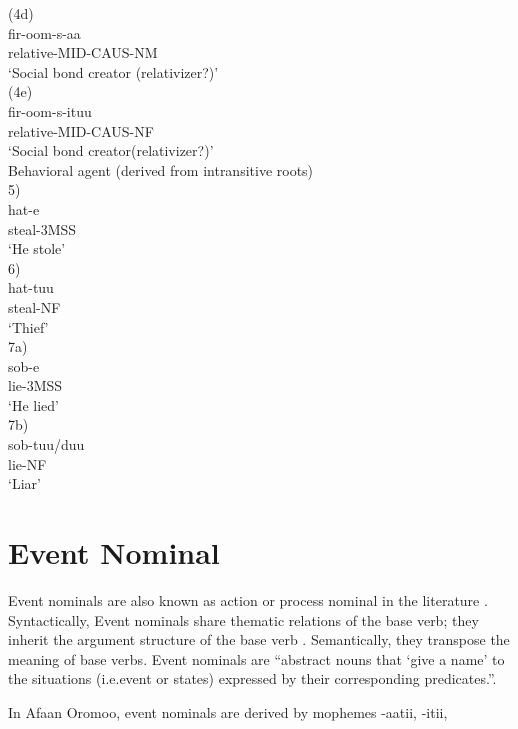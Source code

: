 \documentclass[11pt,a4paper]{article}
\begin{document}
(4d)	\\
\indent fir-oom-s-aa\\
\indent relative-MID-CAUS-NM\\
\indent ‘Social bond creator (relativizer?)’\\

(4e)\\
\indent	fir-oom-s-ituu\\
\indent relative-MID-CAUS-NF\\
\indent ‘Social bond creator(relativizer?)’\\

Behavioral agent (derived from intransitive roots)\\

5) 	\\
\indent hat-e\\
\indent steal-3MSS\\
\indent ‘He stole’\\
6) 	\\
\indent hat-tuu\\
\indent steal-NF\\
\indent ‘Thief’\\

7a) \\
\indent	sob-e\\
\indent lie-3MSS\\
\indent ‘He lied’\\

7b)	\\
\indent sob-tuu/duu \\
\indent lie-NF\\
\indent ‘Liar’\\

\section{Event Nominal}
Event nominals are also known as action or process nominal in the literature \cite{siloni1997event}. Syntactically, Event nominals share thematic relations of the base verb; they inherit the argument structure of the base verb \cite{uth2015event,siloni1997event}. Semantically, they transpose the meaning of base verbs. Event nominals are “abstract nouns that ‘give a name’ to the situations (i.e.event or states) expressed by their corresponding predicates.”\cite{uth2015event}.

In Afaan Oromoo, event nominals are derived by mophemes  -aatii, -itii, \\
\end{document}

